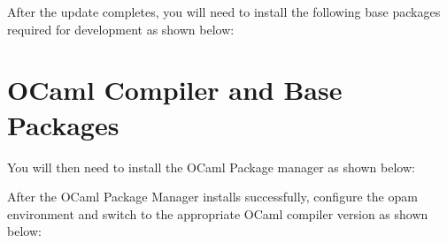 \documentclass[letterpaper,10pt,english]{sphinxmanual}
\begin{document}
After the update completes, you will need to install the following base
packages required for development as shown below:

\begin{sphinxVerbatim}[commandchars=\\\{\}]
      
      
     
     
    
\end{sphinxVerbatim}


\section{OCaml Compiler and Base Packages}
\label{\detokenize{sw-requirements:ocaml-compiler-and-base-packages}}
You will then need to install the OCaml Package manager as shown below:

\begin{sphinxVerbatim}[commandchars=\\\{\}]
 \PYGZbs{}   \PYGZbs{}   
\end{sphinxVerbatim}

After the OCaml Package Manager installs successfully, configure the opam environment and switch to
the appropriate OCaml compiler version as shown below:
\end{document}
